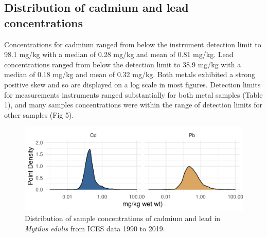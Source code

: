 \documentclass[
  12pt,
]{article}
\begin{document}
\hypertarget{distribution-of-cadmium-and-lead-concentrations}{%
\subsection{Distribution of cadmium and lead
concentrations}\label{distribution-of-cadmium-and-lead-concentrations}}

Concentrations for cadmium ranged from below the instrument detection
limit to 98.1 mg/kg with a median of 0.28 mg/kg and mean of 0.81 mg/kg.
Lead concentrations ranged from below the detection limit to 38.9 mg/kg
with a median of 0.18 mg/kg and mean of 0.32 mg/kg. Both metals
exhibited a strong positive skew and so are displayed on a log scale in
most figures. Detection limits for measurements instruments ranged
substantially for both metal samples (Table 1), and many samples
concentrations were within the range of detection limits for other
samples (Fig 5).

\newpage

\begin{figure}
\centering
\includegraphics{McCrory_ENV972_Project_files/figure-latex/unnamed-chunk-5-1.pdf}
\caption{Distribution of sample concentrations of cadmium and lead in
\emph{Mytilus edulis} from ICES data 1990 to 2019.}
\end{figure}

\newpage
\end{document}
